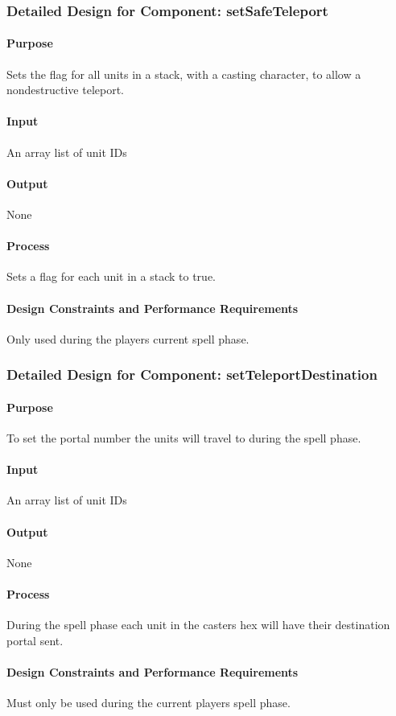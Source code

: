 \documentclass[12pt,a4paper,titlepage]{article}
\begin{document}
\subsubsection{Detailed Design for Component: setSafeTeleport}
\paragraph{Purpose} Sets the flag for all units in a stack, with a casting character, to allow a nondestructive teleport.
\paragraph{Input} An array list of unit IDs
\paragraph{Output} None
\paragraph{Process} Sets a flag for each unit in a stack to true.
\paragraph{Design Constraints and Performance Requirements} Only used during the players current spell phase.

\subsubsection{Detailed Design for Component: setTeleportDestination}
\paragraph{Purpose} To set the portal number the units will travel to during the spell phase.
\paragraph{Input} An array list of unit IDs
\paragraph{Output} None
\paragraph{Process} During the spell phase each unit in the casters hex will have their destination portal sent.
\paragraph{Design Constraints and Performance Requirements} Must only be used during the current players spell phase.
\end{document}
